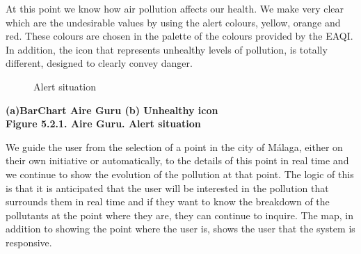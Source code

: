 At this point we know how air pollution affects our health.
We make very clear which are the undesirable values by using the alert colours, yellow, orange and red.
These colours are chosen in the palette of the colours provided by the EAQI.
In addition, the icon that represents unhealthy levels of pollution, is totally different, designed to clearly convey danger. \\

\begin{figure}[ht]
    \centering
    \hfill
    \caption{Alert situation}
\end{figure}

\begin{center}
    \bf{ (a)BarChart Aire Guru (b) Unhealthy icon\\
    
    Figure 5.2.1. Aire Guru. Alert situation}
\end{center} 

We guide the user from the selection of a point in the city of Málaga, either on their own initiative
or automatically, to the details of this point in real time and we continue to show the evolution of the pollution at that point.
The logic of this is that it is anticipated that the user will be interested in the pollution that surrounds them in real time and if
they want to know the breakdown of the pollutants at the point where they are, they can continue to inquire.
The map, in addition to showing the point where the user is, shows the user that the system is responsive.